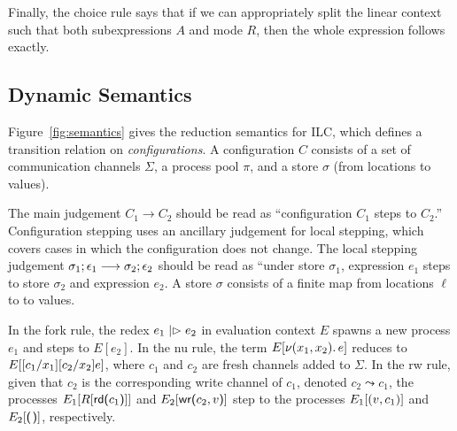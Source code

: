 Finally, the choice rule says that if we can appropriately split the linear
context such that both subexpressions $A$ and mode $R$, then the whole
expression follows exactly.

\subsection{Dynamic Semantics}
\label{subsec:semantics}



Figure~\ref{fig:semantics} gives the reduction semantics for ILC, which defines
a transition relation on \emph{configurations}. A configuration $C$ consists of
a set of communication channels $\Sigma$, a process pool $\pi$, and a store $\sigma$ (from
locations to values).

The main judgement $C_1 \longrightarrow C_2$ should be read as ``configuration $C_1$ steps to
$C_2$.''  Configuration stepping uses an ancillary judgement for local stepping,
which covers cases in which the configuration does not change. The local
stepping judgement $\sigma_1; \epsilon_1 \longrightarrow \sigma_2; \epsilon_2$ should be read as ``under store
$\sigma_1$, expression $e_1$ steps to store $\sigma_{2}$ and expression $e_2$. A store $\sigma$
consists of a finite map from locations $\ell$ to to values.

In the fork rule, the redex $e_1 \mathrel{|\rhd} e_2$ in evaluation context $E$ spawns
a new process $e_1$ and steps to $E[e_2]$. In the nu rule, the term $E[
  \nu(x_1, x_2).\,e ]$ reduces to $E[ [c_1/x_1][c_2/x_2]e ]$,
where $c_1$ and $c_2$ are fresh channels added to $\Sigma$. In the rw rule, given
that $c_2$ is the corresponding write channel of $c_1$, denoted $c_2 \leadsto c_1$, the
processes $E_1[R[ \text{\textsf{rd}}\textsf{(}{c_1}\textsf{)}] ]$ and $E_2[ \text{\textsf{wr}}\textsf{(}{c_2},{v}\textsf{)}]$ step to
the processes $E_1[ (v, c_1)]$ and $E_2[ \eUnit]$,
respectively. 

%
